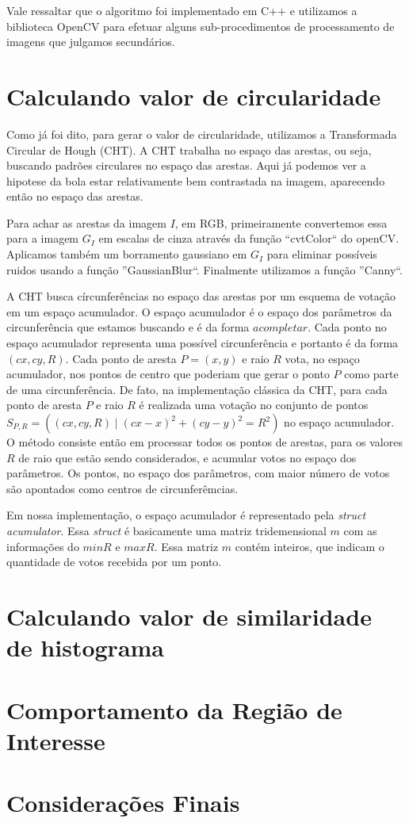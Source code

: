 \documentclass[11pt,a4paper]{article}
\begin{document}
Vale ressaltar que o algoritmo foi implementado em C++ e utilizamos a biblioteca OpenCV para efetuar alguns sub-procedimentos de processamento de imagens que julgamos secundários.

\section{Calculando valor de circularidade}

 Como já foi dito, para gerar o valor de circularidade, utilizamos a Transformada Circular de Hough (CHT). A CHT trabalha no espaço das arestas, ou seja, buscando padrões circulares no espaço das arestas. Aqui já podemos ver a hipotese da bola estar relativamente bem contrastada na imagem, aparecendo então no espaço das arestas.

 Para achar as arestas da imagem $I$, em RGB, primeiramente convertemos essa para a imagem $G_I$ em escalas de cinza através da função ``cvtColor`` do openCV. Aplicamos também um borramento gaussiano em $G_I$ para eliminar possíveis ruidos usando a função ''GaussianBlur``. Finalmente utilizamos a função ''Canny``. 

 A CHT busca círcunferências no espaço das arestas por um esquema de votação em um espaço acumulador. O espaço acumulador é o espaço dos parâmetros da circunferência que estamos buscando e é da forma $a completar$. Cada ponto no espaço acumulador representa uma possível circunferência e portanto é da forma $(cx,cy,R)$. Cada ponto de aresta $P = (x,y)$ e raio $R$ vota, no espaço acumulador, nos pontos de centro que poderiam que gerar o ponto $P$ como parte de uma circunferência. De fato, na implementação clássica da CHT, para cada ponto de aresta $P$ e raio $R$ é realizada uma votação no conjunto de pontos $S_{P,R} = ( (cx,cy,R) \mid (cx - x)^2 + (cy - y)^2 = R^2)$ no espaço acumulador. O método consiste então em processar todos os pontos de arestas, para os valores $R$ de raio que estão sendo considerados, e acumular votos no espaço dos parâmetros. Os pontos, no espaço dos parâmetros, com maior número de votos são apontados como centros de circunferêmcias. 

 Em nossa implementação, o espaço acumulador é representado pela \textit{struct} \textit{acumulator}. Essa \textit{struct} é basicamente uma matriz tridemensional $m$ com as informações do $minR$ e $maxR$. Essa matriz $m$ contém inteiros, que indicam o quantidade de votos recebida por um ponto. 

\section{Calculando valor de similaridade de histograma}
\section{Comportamento da Região de Interesse}
\section{Considerações Finais}


\begin{thebibliography}{99}



\end{thebibliography}
\end{document}
